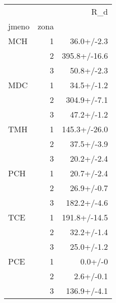 \begin{tabular}{lrr}
\toprule
    &   &           R_d \\
jmeno & zona &               \\
\midrule
MCH & 1 &    36.0+/-2.3 \\
    & 2 &  395.8+/-16.6 \\
    & 3 &    50.8+/-2.3 \\
MDC & 1 &    34.5+/-1.2 \\
    & 2 &   304.9+/-7.1 \\
    & 3 &    47.2+/-1.2 \\
TMH & 1 &  145.3+/-26.0 \\
    & 2 &    37.5+/-3.9 \\
    & 3 &    20.2+/-2.4 \\
PCH & 1 &    20.7+/-2.4 \\
    & 2 &    26.9+/-0.7 \\
    & 3 &   182.2+/-4.6 \\
TCE & 1 &  191.8+/-14.5 \\
    & 2 &    32.2+/-1.4 \\
    & 3 &    25.0+/-1.2 \\
PCE & 1 &       0.0+/-0 \\
    & 2 &     2.6+/-0.1 \\
    & 3 &   136.9+/-4.1 \\
\bottomrule
\end{tabular}
